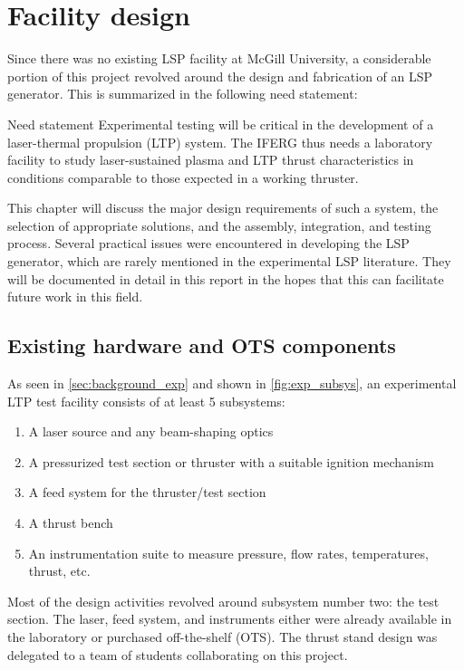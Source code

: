 \chapter{Facility design}
    Since there was no existing LSP facility at McGill University, a considerable portion of this project revolved around the design and fabrication of an LSP generator. This is summarized in the following need statement:

    \begin{statement}{Need statement} 
        Experimental testing will be critical in the development of a laser-thermal propulsion (LTP) system. The IFERG thus needs a laboratory facility to study laser-sustained plasma and LTP thrust characteristics in conditions comparable to those expected in a working thruster.
    \end{statement}
    
    This chapter will discuss the major design requirements of such a system, the selection of appropriate solutions, and the assembly, integration, and testing process. Several practical issues were encountered in developing the LSP generator, which are rarely mentioned in the experimental LSP literature. They will be documented in detail in this report in the hopes that this can facilitate future work in this field.

    \section{Existing hardware and OTS components}
        As seen in \autoref{sec:background_exp} and shown in \autoref{fig:exp_subsys}, an experimental LTP test facility consists of at least 5 subsystems:
        \begin{enumerate}
            \item A laser source and any beam-shaping optics
            \item A pressurized test section or thruster with a suitable ignition mechanism
            \item A feed system for the thruster/test section
            \item A thrust bench
            \item An instrumentation suite to measure pressure, flow rates, temperatures, thrust, etc.
        \end{enumerate}

        Most of the design activities revolved around subsystem number two: the test section. The laser, feed system, and instruments either were already available in the laboratory or purchased off-the-shelf (OTS). The thrust stand design was delegated to a team of students collaborating on this project.

